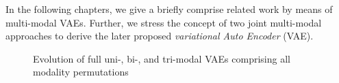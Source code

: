 %
In the following chapters, we give a briefly comprise related work by means of multi-modal VAEs.
%
Further, we stress the concept of two joint multi-modal approaches to derive the later proposed  \textit{variational Auto Encoder} (VAE).
\begin{figure}
	\footnotesize
	\begin{center}
		
	\end{center}
	\caption{Evolution of full uni-, bi-, and tri-modal VAEs comprising all modality permutations}
	\label{fig:VAE}
\end{figure}
%
